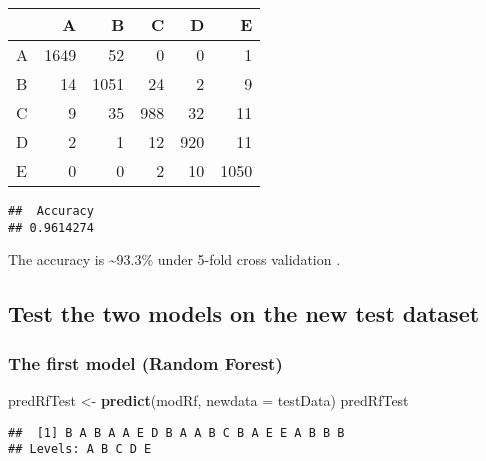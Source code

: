 \documentclass[
]{article}
\newenvironment{Shaded}{\begin{snugshade}}{\end{snugshade}}
\newcommand{\AttributeTok}[1]{\textcolor[rgb]{0.13,0.29,0.53}{#1}}
\newcommand{\DecValTok}[1]{\textcolor[rgb]{0.00,0.00,0.81}{#1}}
\newcommand{\FunctionTok}[1]{\textcolor[rgb]{0.13,0.29,0.53}{\textbf{#1}}}
\newcommand{\NormalTok}[1]{#1}
\newcommand{\OtherTok}[1]{\textcolor[rgb]{0.56,0.35,0.01}{#1}}
\newcommand{\SpecialCharTok}[1]{\textcolor[rgb]{0.81,0.36,0.00}{\textbf{#1}}}
\begin{document}
\begin{tabular}{l|r|r|r|r|r}
\hline
  & A & B & C & D & E\\
\hline
A & 1649 & 52 & 0 & 0 & 1\\
\hline
B & 14 & 1051 & 24 & 2 & 9\\
\hline
C & 9 & 35 & 988 & 32 & 11\\
\hline
D & 2 & 1 & 12 & 920 & 11\\
\hline
E & 0 & 0 & 2 & 10 & 1050\\
\hline
\end{tabular}

\begin{Shaded}
\end{Shaded}

\begin{verbatim}
##  Accuracy 
## 0.9614274
\end{verbatim}

The accuracy is \textasciitilde93.3\% under 5-fold cross validation .

\hypertarget{test-the-two-models-on-the-new-test-dataset}{%
\subsection{Test the two models on the new test
dataset}\label{test-the-two-models-on-the-new-test-dataset}}

\hypertarget{the-first-model-random-forest}{%
\subsubsection{The first model (Random
Forest)}\label{the-first-model-random-forest}}

\begin{Shaded}
\begin{Highlighting}[]
\NormalTok{predRfTest }\OtherTok{\textless{}{-}} \FunctionTok{predict}\NormalTok{(modRf, }\AttributeTok{newdata =}\NormalTok{ testData)}
\NormalTok{predRfTest}
\end{Highlighting}
\end{Shaded}

\begin{verbatim}
##  [1] B A B A A E D B A A B C B A E E A B B B
## Levels: A B C D E
\end{verbatim}
\end{document}
